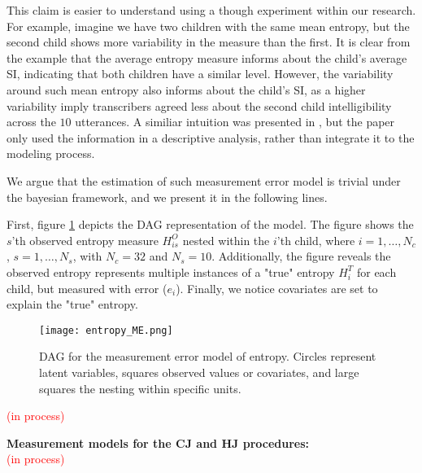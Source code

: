 This claim is easier to understand using a though experiment within our research. For example, imagine we have two children with the same mean entropy, but the second child shows more variability in the measure than the first. It is clear from the example that the average entropy measure informs about the child's average SI, indicating that both children have a similar level. However, the variability around such mean entropy also informs about the child's SI, as a higher variability imply transcribers agreed less about the second child intelligibility across the $10$ utterances. A similiar intuition was presented in \citet{Boonen_et_al_2021}, but the paper only used the information in a descriptive analysis, rather than integrate it to the modeling process. 

We argue that the estimation of such measurement error model is trivial under the bayesian framework, and we present it in the following lines.

First, figure \ref{fig:entropy_ME} depicts the DAG representation of the model. The figure shows the $s$'th observed entropy measure $H^{O}_{is}$ nested within the $i$'th child, where $i=1, \dots, N_{c}$, $s=1, \dots, N_{s}$, with $N_{c} = 32$  and $N_{s} = 10$. Additionally, the figure reveals the observed entropy represents multiple instances of a "true" entropy $H^{T}_{i}$ for each child, but measured with error ($e_i$). Finally, we notice covariates are set to explain the "true" entropy.
%
\begin{figure}[h]
	\centering
	\texttt{[image: entropy\_ME.png]}
	\caption[DAG for the measurement error model of entropy.]%
	{DAG for the measurement error model of entropy. Circles represent latent variables, squares observed values or covariates, and large squares the nesting within specific units.}
	\label{fig:entropy_ME}
\end{figure}
%

\textcolor{red}{(in process)} \\

\begin{comment}
- Normal measurement error model: 
entropy_j ~ N( entropy_true_j, sigma_e) 

- In (Faes_et_al_2021) they use a random effects model for the entropy. 
entropy_j = entropy_true_j + error 
error ~ N( 0, sigma_e) 
* Notice both are the same (priors for entropy_true_j are needed) 

- Beta measurement error model: 
entropy_j ~ beta(alpha, beta) 
alpha = mu*M        ->  mu = alpha / M (mean) 
beta = (1 - mu)*M  ->  M = alpha + beta (prior sample size) 
* where mu = entropy_true_j and M is a distribution centered in 10 (utterances) 
\end{comment}
%
%
\noindent \textbf{Measurement models for the CJ and HJ procedures:} \\
%
\textcolor{red}{(in process)}

